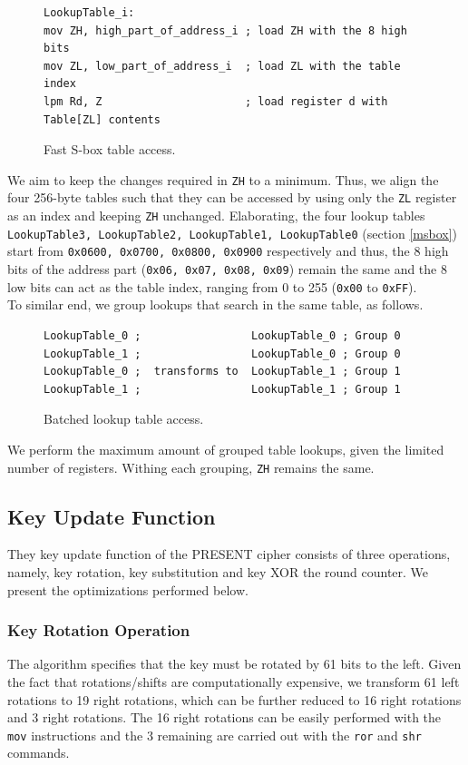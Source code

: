 \documentclass{llncs}
\begin{document}
\begin{figure}
\begin{lstlisting}
LookupTable_i:
mov ZH, high_part_of_address_i ; load ZH with the 8 high bits
mov ZL, low_part_of_address_i  ; load ZL with the table index
lpm Rd, Z                      ; load register d with Table[ZL] contents
\end{lstlisting}
	\caption{Fast S-box table access.}
\label{sbox_squared}
\end{figure}
We aim to keep the changes required in \texttt{ZH} to a minimum. Thus, we align the four 256-byte tables such that they can be accessed by using only the  \texttt{ZL} register as an index and keeping \texttt{ZH} unchanged. Elaborating, the four lookup tables \texttt{LookupTable3, LookupTable2, LookupTable1, LookupTable0} (section \ref{msbox}) start from \texttt{0x0600, 0x0700, 0x0800, 0x0900} respectively and thus, the 8 high bits of the address part (\texttt{0x06, 0x07, 0x08, 0x09}) remain the same and the 8 low bits can act as the table index, ranging from 0 to 255 (\texttt{0x00} to \texttt{0xFF}). \\
To similar end, we group lookups that search in the same table, as follows.
\begin{figure}
\begin{lstlisting}
LookupTable_0 ;	                LookupTable_0 ; Group 0 
LookupTable_1 ;	                LookupTable_0 ; Group 0
LookupTable_0 ;  transforms to  LookupTable_1 ; Group 1
LookupTable_1 ;	                LookupTable_1 ; Group 1
\end{lstlisting}
	\caption{Batched lookup table access.}
\label{batched_lookup}
\end{figure}
We perform the maximum amount of grouped table lookups, given the limited number of registers. Withing each grouping, \texttt{ZH} remains the same.
\subsection{Key Update Function}
They key update function of the PRESENT cipher consists of three operations, namely, key rotation, key substitution and key XOR the round counter. We present the optimizations performed below.
\subsubsection{Key Rotation Operation}
The algorithm specifies that the key must be rotated by 61 bits to the left. Given the fact that rotations/shifts are computationally expensive, we transform 61 left rotations to 19 right rotations, which can be further reduced to 16 right rotations and 3 right rotations. The 16 right rotations can be easily performed with the \texttt{mov} instructions and the 3 remaining are carried out with the \texttt{ror} and \texttt{shr} commands.
\end{document}
